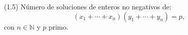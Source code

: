 
(1.5) Número de soluciones de enteros no negativos de:
\[
  (x_1+\cdots+x_n)(y_1+\cdots+y_n) = p,
\]
con $n\in\mathbb{N}$ y $p$ primo.

